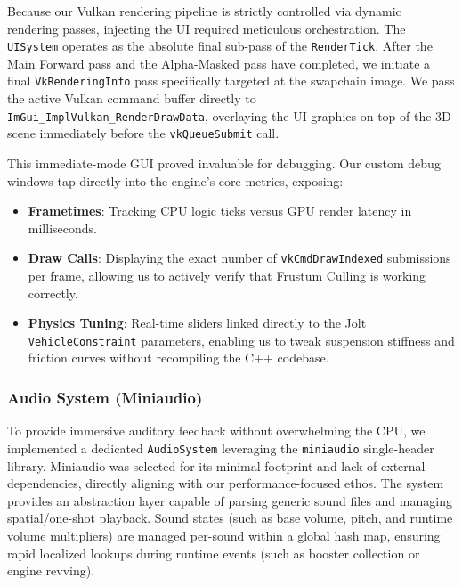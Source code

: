 \documentclass[acmtog, nonacm]{acmart}
\begin{document}
Because our Vulkan rendering pipeline is strictly controlled via dynamic rendering passes, injecting the UI required meticulous orchestration. The \texttt{UISystem} operates as the absolute final sub-pass of the \texttt{RenderTick}. After the Main Forward pass and the Alpha-Masked pass have completed, we initiate a final \texttt{VkRenderingInfo} pass specifically targeted at the swapchain image. We pass the active Vulkan command buffer directly to \texttt{ImGui\_ImplVulkan\_RenderDrawData}, overlaying the UI graphics on top of the 3D scene immediately before the \texttt{vkQueueSubmit} call.

This immediate-mode GUI proved invaluable for debugging. Our custom debug windows tap directly into the engine's core metrics, exposing:
\begin{itemize}
    \item \textbf{Frametimes}: Tracking CPU logic ticks versus GPU render latency in milliseconds.
    \item \textbf{Draw Calls}: Displaying the exact number of \texttt{vkCmdDrawIndexed} submissions per frame, allowing us to actively verify that Frustum Culling is working correctly.
    \item \textbf{Physics Tuning}: Real-time sliders linked directly to the Jolt \texttt{VehicleConstraint} parameters, enabling us to tweak suspension stiffness and friction curves without recompiling the C++ codebase.
\end{itemize}

\subsubsection{Audio System (Miniaudio)}
To provide immersive auditory feedback without overwhelming the CPU, we implemented a dedicated \texttt{AudioSystem} leveraging the \texttt{miniaudio} single-header library. Miniaudio was selected for its minimal footprint and lack of external dependencies, directly aligning with our performance-focused ethos. The system provides an abstraction layer capable of parsing generic sound files and managing spatial/one-shot playback. Sound states (such as base volume, pitch, and runtime volume multipliers) are managed per-sound within a global hash map, ensuring rapid localized lookups during runtime events (such as booster collection or engine revving).
\end{document}
